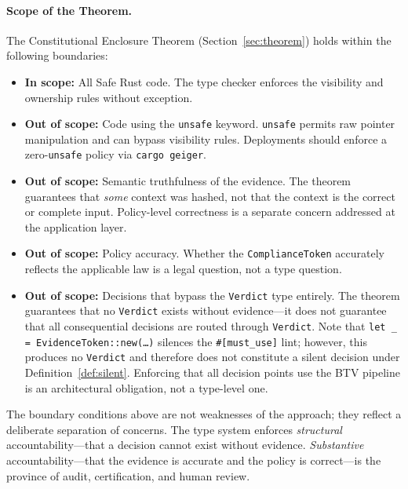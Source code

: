 \paragraph{Scope of the Theorem.}
The Constitutional Enclosure Theorem (Section~\ref{sec:theorem})
holds within the following boundaries:

\begin{itemize}
  \item \textbf{In scope:} All Safe Rust code.  The type checker
    enforces the visibility and ownership rules without exception.
  \item \textbf{Out of scope:} Code using the \texttt{unsafe}
    keyword.  \texttt{unsafe} permits raw pointer manipulation and
    can bypass visibility rules.  Deployments should enforce a
    zero-\texttt{unsafe} policy via \texttt{cargo geiger}.
  \item \textbf{Out of scope:} Semantic truthfulness of the evidence.
    The theorem guarantees that \emph{some} context was hashed, not
    that the context is the correct or complete input.  Policy-level
    correctness is a separate concern addressed at the application layer.
  \item \textbf{Out of scope:} Policy accuracy.  Whether the
    \texttt{ComplianceToken} accurately reflects the applicable law
    is a legal question, not a type question.
  \item \textbf{Out of scope:} Decisions that bypass the
    \texttt{Verdict} type entirely.  The theorem guarantees that no
    \texttt{Verdict} exists without evidence---it does not guarantee
    that all consequential decisions are routed through
    \texttt{Verdict}.  Note that \texttt{let \_ =
    EvidenceToken::new(\ldots)} silences the \texttt{\#[must\_use]}
    lint; however, this produces no \texttt{Verdict} and therefore
    does not constitute a silent decision under
    Definition~\ref{def:silent}.  Enforcing that all decision points
    use the BTV pipeline is an architectural obligation, not a
    type-level one.
\end{itemize}

The boundary conditions above are not weaknesses of the approach;
they reflect a deliberate separation of concerns.  The type system
enforces \emph{structural} accountability---that a decision cannot
exist without evidence.  \emph{Substantive} accountability---that
the evidence is accurate and the policy is correct---is the province
of audit, certification, and human review.

